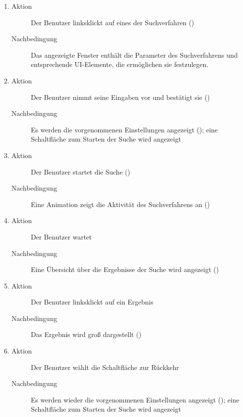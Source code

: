 \begin{description}
\begin{enumerate}
\begin{description}
		\end{description}
		\item
		\begin{description}
			\item[Aktion] Der Benutzer linksklickt auf eines der Suchverfahren ()
			\item[Nachbedingung] Das angezeigte Fenster enthält die Parameter des Suchverfahrens und entsprechende UI-Elemente, die ermöglichen sie festzulegen.
		\end{description}
		\item
		\begin{description}
			\item[Aktion] Der Benutzer nimmt seine Eingaben vor und bestätigt sie ()
			\item[Nachbedingung] Es werden die vorgenommenen Einstellungen angezeigt (); eine Schaltfläche zum Starten der Suche wird angezeigt
		\end{description}
		\item
		\begin{description}
			\item[Aktion] Der Benutzer startet die Suche ()
			\item[Nachbedingung] Eine Animation zeigt die Aktivität des Suchverfahrens an ()
		\end{description}
		\item
		\begin{description}
			\item[Aktion] Der Benutzer wartet
			\item[Nachbedingung] Eine Übersicht über die Ergebnisse der Suche wird angezeigt ()
		\end{description}
		\item
		\begin{description}
			\item[Aktion] Der Benutzer linksklickt auf ein Ergebnis
			\item[Nachbedingung] Das Ergebnis wird groß dargestellt ()
		\end{description}
		\item
		\begin{description}
			\item[Aktion] Der Benutzer wählt die Schaltfläche zur Rückkehr
			\item[Nachbedingung] Es werden wieder die vorgenommenen Einstellungen angezeigt (); eine Schaltfläche zum Starten der Suche wird angezeigt

\end{description}
\end{enumerate}
\end{description}
